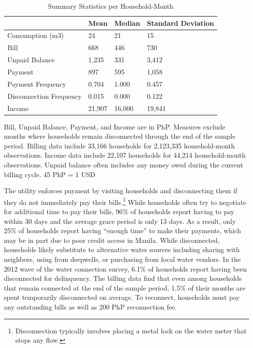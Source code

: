 \documentclass[12pt]{article}
\begin{document}
\begin{table}[h!]
\centering
\caption{Summary Statistics per Household-Month}\label{table:descriptives_all}
\vspace{-2mm}
\begin{threeparttable}
\begin{tabular}{@{}l*{1}{KKK}@{}}
\toprule
  & Mean & Median & Standard Deviation \\
\midrule
Consumption (m3) & 24 & 21 &  15 \\
Bill &  668 & 446 &  730 \\
Unpaid Balance &  1,235 & 331 &  3,412 \\
Payment &  897 & 595 &  1,058 \\
Payment Frequency &  0.704 & 1.000 &  0.457 \\
Disconnection Frequency &  0.015 & 0.000 &  0.122 \\
Income &  21,907 & 16,000 &  19,841 \\
\bottomrule
\end{tabular}
\begin{tablenotes}
\footnotesize
\item Bill, Unpaid Balance, Payment, and Income are in PhP.  Measures exclude months where households remain disconnected through the end of the sample period.  Billing data include 33,166 households for 2,123,335 household-month observations.  Income data include 22,107 households for 44,214 household-month observations.  Unpaid balance often includes any money owed during the current billing cycle.  45 PhP = 1 USD \,\,
\end{tablenotes}
\end{threeparttable}
\end{table}

The utility enforces payment by visiting households and disconnecting them if they do not immediately pay their bills.\footnote{Disconnection typically involves placing a metal lock on the water meter that stops any flow.}  While households often try to negotiate for additional time to pay their bills, 96\unskip\% of households report having to pay within 30 days and the average grace period is only 13 days.  As a result, only 25\unskip\% of households report having ``enough time'' to make their payments, which may be in part due to poor credit access in Manila.  While disconnected, households likely substitute to alternative water sources including sharing with neighbors, using from deepwells, or purchasing from local water vendors.  In the 2012 wave of the water connection survey, 6.1\unskip\% of households report having been disconnected for delinquency.  The billing data find that even among households that remain connected at the end of the sample period, 1.5\% of their months are spent temporarily disconnected on average.  To reconnect, households must pay any outstanding bills as well as 200 PhP reconnection fee.
\end{document}
